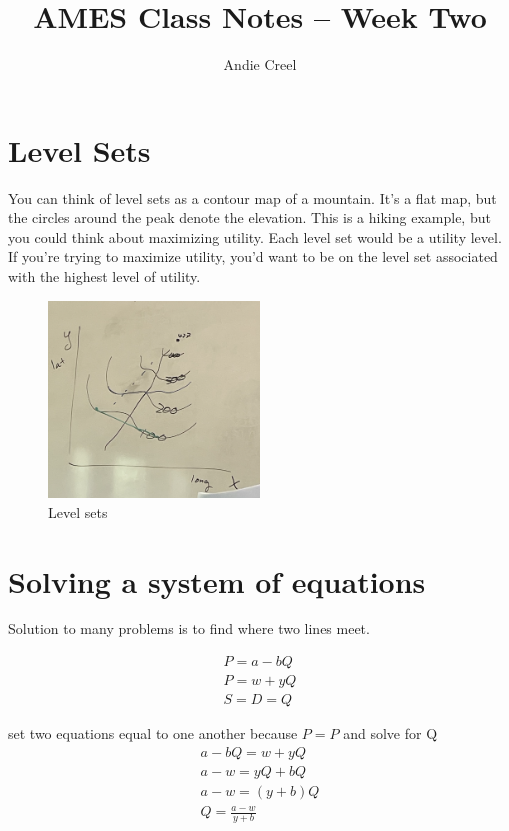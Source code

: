 \documentclass{article}
\title{AMES Class Notes -- Week Two}
\author{Andie Creel}
\begin{document}
\maketitle

\section{Level Sets}
You can think of level sets as a contour map of a mountain. It's a flat map, but the circles around the peak denote the elevation. This is a hiking example, but you could think about maximizing utility. Each level set would be a utility level. If you're trying to maximize utility, you'd want to be on the level set associated with the highest level of utility. 

\begin{figure}[htp]
    \centering
        \includegraphics[width=0.5\textwidth]{Screen Shot 2023-09-06 at 10.57.01 AM.png}
    \caption{Level sets}
    \label{fig:sample}
\end{figure}

\section{Solving a system of equations}

Solution to many problems is to find where two lines meet. 

\begin{align}
    P = a-bQ \\
    P = w +yQ\\
    S = D = Q
\end{align}

set two equations equal to one another because $P = P$ and solve for Q
\begin{align}
    a - bQ = w + yQ \\
    a - w = yQ + bQ \\
    a - w = (y+b) Q\\
    Q = \frac{a - w}{y + b}
\end{align}
\end{document}
